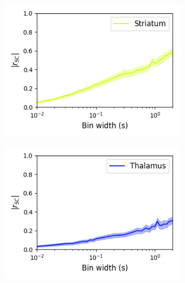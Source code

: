 \documentclass[a4paper,12pt]{article}
\theoremstyle{definition}
\begin{document}
\begin{figure}[p]
\begin{subfigure}{0.5\textwidth}
  \end{subfigure}
  \begin{subfigure}{0.5\textwidth}
    \centering
    \includegraphics[width=\textwidth]{figures/bin_width_correlations_striatum_14.png}
  \end{subfigure}
  \begin{subfigure}{0.5\textwidth}
    \centering
    \includegraphics[width=\textwidth]{figures/bin_width_correlations_thalamus_15.png}
  \end{subfigure}
  \begin{subfigure}{0.5\textwidth}
    \centering

\end{subfigure}
\end{figure}
\end{document}
